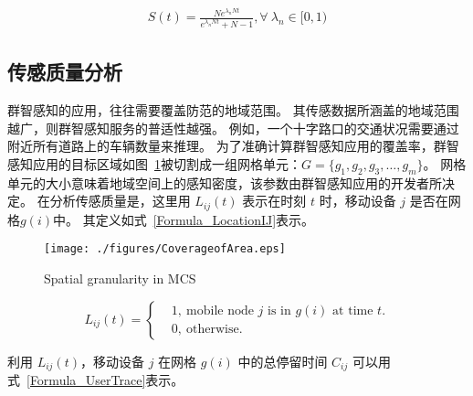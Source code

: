 \begin{equation}
\label{Formula_St}
  \begin{aligned}
    S(t) = \frac{N e^{\lambda_n N t}}{e^{\lambda_n N t} + N -1}, \forall \ \lambda_n \in [0,1)
  \end{aligned}
\end{equation}

\subsection{传感质量分析}

群智感知的应用，往往需要覆盖防范的地域范围。
其传感数据所涵盖的地域范围越广，则群智感知服务的普适性越强。
例如，一个十字路口的交通状况需要通过附近所有道路上的车辆数量来推理。
为了准确计算群智感知应用的覆盖率，群智感知应用的目标区域如图~\ref{Figure_CoverageofArea}被切割成一组网格单元：$G = \{g_1,g_2,g_3,\ldots,g_m\}$。
网格单元的大小意味着地域空间上的感知密度，该参数由群智感知应用的开发者所决定。
在分析传感质量是，这里用 $L_{ij}(t)$ 表示在时刻 $t$ 时，移动设备 $j$ 是否在网格$g(i)$中。
其定义如式~\eqref{Formula_LocationIJ}表示。

\begin{figure}[!h]
  \centering
  \texttt{[image: ./figures/CoverageofArea.eps]}
  \vspace{-0.5em}
  \caption{Spatial granularity in MCS}
  \vspace{-0.5em}
  \label{Figure_CoverageofArea}
\end{figure}

\begin{equation}
  \label{Formula_LocationIJ}
  L_{ij}(t) = \left \{
  \begin{aligned}
  & 1,\ \text{mobile node $j$ is in $g(i)$ at time $t$.}\\
  & 0,\ \text{otherwise.}
  \end{aligned}
  \right.
\end{equation}

利用 $L_{ij}(t)$，移动设备 $j$ 在网格 $g(i)$ 中的总停留时间 $C_{ij}$ 可以用式~\eqref{Formula_UserTrace}表示。

